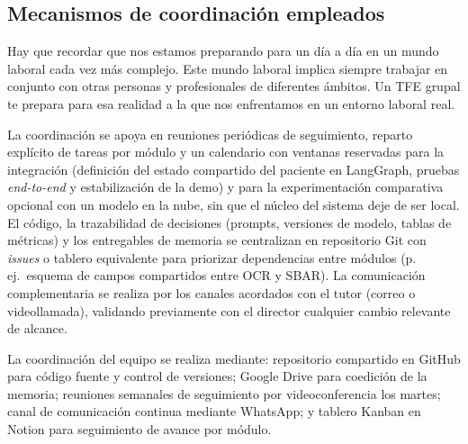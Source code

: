 \subsection*{Mecanismos de coordinación empleados}
Hay que recordar que nos estamos preparando para un día a día en un mundo laboral cada vez más complejo. Este mundo laboral implica siempre trabajar en conjunto con otras personas y profesionales de diferentes ámbitos.  Un TFE grupal te prepara para esa realidad a la que nos enfrentamos en un entorno laboral real.

La coordinación se apoya en reuniones periódicas de seguimiento, reparto explícito de tareas por módulo y un calendario con ventanas reservadas para la integración (definición del estado compartido del paciente en LangGraph, pruebas \emph{end-to-end} y estabilización de la demo) y para la experimentación comparativa opcional con un modelo en la nube, sin que el núcleo del sistema deje de ser local. El código, la trazabilidad de decisiones (prompts, versiones de modelo, tablas de métricas) y los entregables de memoria se centralizan en repositorio Git con \emph{issues} o tablero equivalente para priorizar dependencias entre módulos (p.\,ej.\ esquema de campos compartidos entre OCR y SBAR). La comunicación complementaria se realiza por los canales acordados con el tutor (correo o videollamada), validando previamente con el director cualquier cambio relevante de alcance.

La coordinación del equipo se realiza mediante: repositorio compartido en GitHub para código fuente y control de versiones; Google Drive para coedición de la memoria; reuniones semanales de seguimiento por videoconferencia los martes; canal de comunicación continua mediante WhatsApp; y tablero Kanban en Notion para seguimiento de avance por módulo.
